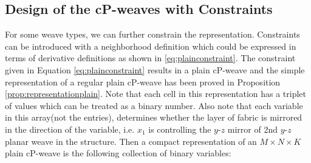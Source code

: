\documentclass[unnumsec,webpdf,contemporary,large]{oup-authoring-template}%
\theoremstyle{thmstyleone}%
\theoremstyle{thmstyletwo}%
\theoremstyle{thmstylethree}%
\begin{document}
\subsection{Design of the cP-weaves with Constraints}

For some weave types, we can further constrain the representation. Constraints can be introduced with a neighborhood definition which could be expressed in terms of derivative definitions as shown in \ref{eq:plainconstraint}. The constraint given in Equation \ref{eq:plainconstraint} results in a plain cP-weave and the simple representation of a regular plain cP-weave has been proved in Proposition \ref{prop:representationplain}. Note that each cell in this representation has a triplet of values which can be treated as a binary number. Also note that each variable in this array(not the entries), determines whether the layer of fabric is mirrored in the direction of the variable, i.e. $x_1$ is controlling the $y$-$z$ mirror of 2nd $y$-$z$ planar weave in the structure. Then a compact representation of an $M\times N\times K$ plain cP-weave is the following collection of binary variables:

\end{document}
